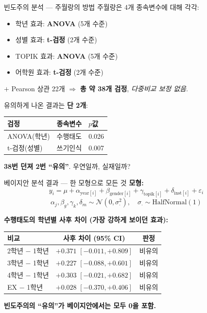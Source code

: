 \documentclass[aspectratio=169, 11pt]{beamer}
\begin{document}
\begin{frame}{빈도주의 분석 — 주월랑의 방법}
주월랑은 4개 종속변수에 대해 각각:
\begin{itemize}
\item 학년 효과: \textbf{ANOVA} (5개 수준)
\item 성별 효과: \textbf{t-검정} (2개 수준)
\item TOPIK 효과: \textbf{ANOVA} (5개 수준)
\item 어학원 효과: \textbf{t-검정} (2개 수준)
\end{itemize}
$+$ Pearson 상관 22개 $\Rightarrow$ \textbf{총 약 38개 검정}, \emph{다중비교 보정 없음}.

\vspace{0.3cm}
유의하게 나온 결과는 \textbf{단 2개}:
\begin{tabular}{lll}
\toprule
검정 & 종속변수 & $p$값 \\
\midrule
ANOVA(학년) & 수행태도 & 0.026 \\
t-검정(성별) & 쓰기인식 & 0.007 \\
\bottomrule
\end{tabular}

\vspace{0.3cm}
\centering
\textbf{38번 던져 2번 ``유의''}. 우연일까, 실재일까?
\end{frame}

\begin{frame}{베이지안 분석 결과 — 한 모형으로 모든 것}
\textbf{모형:}
$$
y_i = \mu + \alpha_{\text{year}[i]} + \beta_{\text{gender}[i]} + \gamma_{\text{topik}[i]} + \delta_{\text{inst}[i]} + \varepsilon_i
$$
$$
\alpha_j, \beta_g, \gamma_k, \delta_m \sim \mathcal{N}(0, \sigma_\cdot^2), \quad \sigma_\cdot \sim \text{HalfNormal}(1)
$$

\vspace{0.3cm}
\textbf{수행태도의 학년별 사후 차이 (가장 강하게 보이던 효과):}
\begin{tabular}{lcc}
\toprule
비교 & 사후 차이 (95\% CI) & 판정 \\
\midrule
2학년 $-$ 1학년 & $+0.371$ $[-0.011, +0.809]$ & 비유의 \\
3학년 $-$ 1학년 & $+0.227$ $[-0.088, +0.601]$ & 비유의 \\
4학년 $-$ 1학년 & $+0.303$ $[-0.021, +0.682]$ & 비유의 \\
EX $-$ 1학년 & $+0.028$ $[-0.370, +0.406]$ & 비유의 \\
\bottomrule
\end{tabular}

\vspace{0.3cm}
\centering
\textbf{빈도주의의 ``유의''가 베이지안에서는 모두 0을 포함.}
\end{frame}
\end{document}
